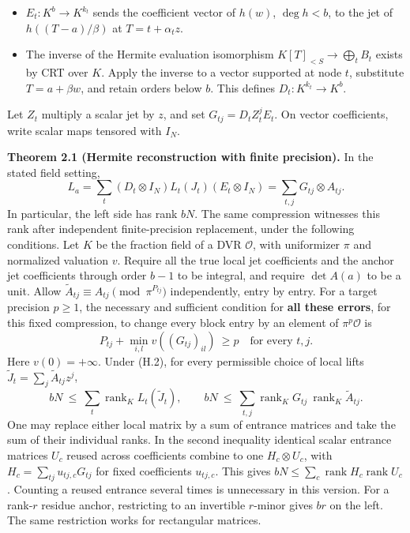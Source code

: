 \documentclass[
  11pt,
]{article}
\providecommand{\tightlist}{%
  \setlength{\itemsep}{0pt}\setlength{\parskip}{0pt}}
\begin{document}
\begin{itemize}
\tightlist
\item
  \(E_t:K^b\longrightarrow K^{k_t}\) sends the coefficient vector of
  \(h(w)\), \(\deg h<b\), to the jet of \(h((T-a)/\beta)\) at
  \(T=t+\alpha_tz\).
\item
  The inverse of the Hermite evaluation isomorphism
  \(K[T]_{<S}\longrightarrow\bigoplus_t B_t\) exists by CRT over \(K\).
  Apply the inverse to a vector supported at node \(t\), substitute
  \(T=a+\beta w\), and retain orders below \(b\). This defines
  \(D_t:K^{k_t}\longrightarrow K^b\).
\end{itemize}

Let \(Z_t\) multiply a scalar jet by \(z\), and set
\(G_{tj}=D_tZ_t^jE_t\). On vector coefficients, write scalar maps
tensored with \(I_N\).

\textbf{Theorem 2.1 (Hermite reconstruction with finite precision).} In
the stated field setting, \[
 L_a=\sum_t (D_t\otimes I_N)L_t(J_t)(E_t\otimes I_N)
     =\sum_{t,j} G_{tj}\otimes A_{tj} . \tag{H.1}
\] In particular, the left side has rank \(bN\). The same compression
witnesses this rank after independent finite-precision replacement,
under the following conditions. Let \(K\) be the fraction field of a DVR
\(\mathcal O\), with uniformizer \(\pi\) and normalized valuation \(v\).
Require all the true local jet coefficients and the anchor jet
coefficients through order \(b-1\) to be integral, and require
\(\det A(a)\) to be a unit. Allow
\(\widetilde A_{tj}\equiv A_{tj}\pmod{\pi^{P_{tj}}}\) independently,
entry by entry. For a target precision \(p\ge1\), the necessary and
sufficient condition for \textbf{all these errors}, for this fixed
compression, to change every block entry by an element of
\(\pi^p\mathcal O\) is \[
       P_{tj}+\min_{i,l} v((G_{tj})_{il})\ \ge p\quad\text{for every }t,j. \tag{H.2}
\] Here \(v(0)=+\infty\). Under (H.2), for every permissible choice of
local lifts \(\widetilde J_t=\sum_j\widetilde A_{tj}z^j\), \[
 bN\ \le\ \sum_t\operatorname{rank}_K L_t(\widetilde J_t),\qquad
 bN\ \le\ \sum_{t,j}\operatorname{rank}_K G_{tj}\ \operatorname{rank}_K\widetilde A_{tj}. \tag{H.3}
\] One may replace either local matrix by a sum of entrance matrices and
take the sum of their individual ranks. In the second inequality
identical scalar entrance matrices \(U_c\) reused across coefficients
combine to one \(H_c\otimes U_c\), with \(H_c=\sum_{tj}u_{tj,c}G_{tj}\)
for fixed coefficients \(u_{tj,c}\). This gives
\(bN\le\sum_c\operatorname{rank}H_c\operatorname{rank}U_c\). Counting a
reused entrance several times is unnecessary in this version. For a
rank-\(r\) residue anchor, restricting to an invertible \(r\)-minor
gives \(br\) on the left. The same restriction works for rectangular
matrices.
\end{document}
